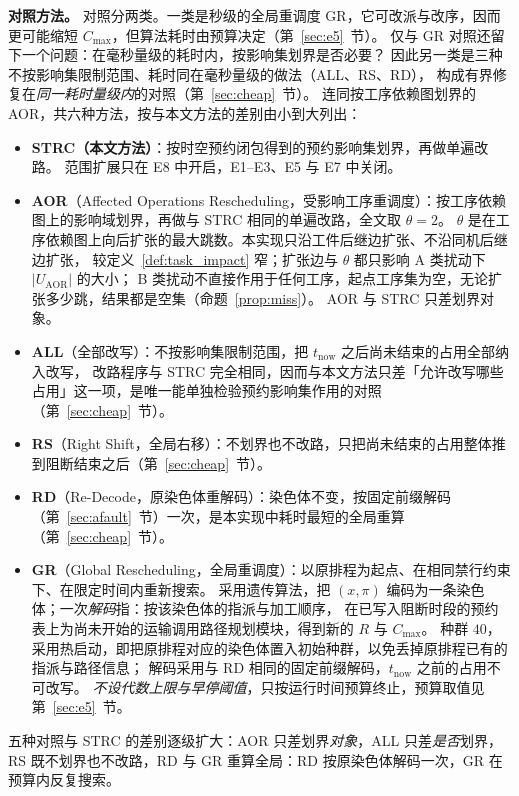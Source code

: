 \documentclass[manuscript,screen,review]{acmart}
\providecommand{\STRC}{\textsc{STRC}}
\begin{document}
\textbf{对照方法。}
\label{sec:vs_r0}
对照分两类。一类是秒级的全局重调度 GR，它可改派与改序，因而更可能缩短 \(C_{\max}\)，但算法耗时由预算决定（第~\ref{sec:e5}~节）。
仅与 GR 对照还留下一个问题：在毫秒量级的耗时内，按影响集划界是否必要？
因此另一类是三种不按影响集限制范围、耗时同在毫秒量级的做法（ALL、RS、RD），
构成有界修复在\emph{同一耗时量级内}的对照（第~\ref{sec:cheap}~节）。
连同按工序依赖图划界的 AOR，共六种方法，按与本文方法的差别由小到大列出：
\begin{itemize}[leftmargin=1.5em,itemsep=0.2em]
\item \textbf{\STRC{}（本文方法）}：按时空预约闭包得到的预约影响集划界，再做单遍改路。
范围扩展只在 E8 中开启，E1--E3、E5 与 E7 中关闭。
\item \textbf{AOR}（Affected Operations Rescheduling，受影响工序重调度）：按工序依赖图上的影响域划界，再做与 \STRC{} 相同的单遍改路，全文取 \(\theta=2\)。
\(\theta\) 是在工序依赖图上向后扩张的最大跳数。本实现只沿工件后继边扩张、不沿同机后继边扩张，
较定义~\ref{def:task_impact} 窄；扩张边与 \(\theta\) 都只影响 A 类扰动下 \(|U_{\mathrm{AOR}}|\) 的大小；
B 类扰动不直接作用于任何工序，起点工序集为空，无论扩张多少跳，结果都是空集（命题~\ref{prop:miss}）。
AOR 与 \STRC{} 只差划界对象。
\item \textbf{ALL}（全部改写）：不按影响集限制范围，把 \(t_{\mathrm{now}}\) 之后尚未结束的占用全部纳入改写，
改路程序与 \STRC{} 完全相同，因而与本文方法只差「允许改写哪些占用」这一项，是唯一能单独检验预约影响集作用的对照（第~\ref{sec:cheap}~节）。
\item \textbf{RS}（Right Shift，全局右移）：不划界也不改路，只把尚未结束的占用整体推到阻断结束之后（第~\ref{sec:cheap}~节）。
\item \textbf{RD}（Re-Decode，原染色体重解码）：染色体不变，按固定前缀解码（第~\ref{sec:afault}~节）一次，是本实现中耗时最短的全局重算（第~\ref{sec:cheap}~节）。
\item \textbf{GR}（Global Rescheduling，全局重调度）：以原排程为起点、在相同禁行约束下、在限定时间内重新搜索。
采用遗传算法，把 \((x,\pi)\) 编码为一条染色体；一次\emph{解码}指：按该染色体的指派与加工顺序，
在已写入阻断时段的预约表上为尚未开始的运输调用路径规划模块，得到新的 \(R\) 与 \(C_{\max}\)。
种群 \(40\)，采用热启动，即把原排程对应的染色体置入初始种群，以免丢掉原排程已有的指派与路径信息；
解码采用与 RD 相同的固定前缀解码，\(t_{\mathrm{now}}\) 之前的占用不可改写。
\emph{不设代数上限与早停阈值}，只按运行时间预算终止，预算取值见第~\ref{sec:e5}~节。
\end{itemize}
五种对照与 \STRC{} 的差别逐级扩大：AOR 只差划界\emph{对象}，ALL 只差\emph{是否}划界，
RS 既不划界也不改路，RD 与 GR 重算全局：RD 按原染色体解码一次，GR 在预算内反复搜索。
\end{document}
